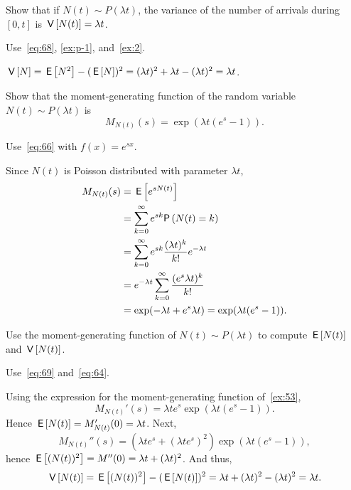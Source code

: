 \begin{extra}
  Show that if $N(t)\sim P(\lambda t)$, the variance of the number of arrivals during $[0,t]$ is $\,\mathsf{V}\left[N(t)\right] = \lambda t$.
\begin{hint} Use~\cref{eq:68}, \cref{ex:p-1},  and~\cref{ex:2}.
\end{hint}
\begin{solution} 
$\,\mathsf{V}\left[N\right] = \,\mathsf{E}\left[N^2\right] - (\,\mathsf{E}\left[N\right])^2 = (\lambda t)^2 + \lambda t - (\lambda t)^2 = \lambda t$.
\end{solution}
\end{extra}

\begin{extra} 
Show that the moment-generating function of the random variable~$N(t)\sim P(\lambda t)$ is
\begin{equation*}
M_{N(t)}(s) 
= \exp{(\lambda t(e^s-1))}.
\end{equation*}
\begin{hint}
Use~\cref{eq:66} with $f(x) = e^{sx}$. 
\end{hint}
\begin{solution}
Since $N(t)$ is Poisson distributed with parameter $\lambda t$, 
\begin{align*}
M_{N(t)}(s)
&= \E{e^{s N(t)}} \\
&= \sum_{k=0}^\infty e^{s k} \P{N(t)=k} \\
&= \sum_{k=0}^\infty e^{s k} \frac{(\lambda t)^k}{k!} e^{-\lambda t} \\
&= e^{-\lambda t} \sum_{k=0}^\infty \frac{(e^s \lambda t)^k}{k!} \\
&= \exp(-\lambda t + e^s \lambda t) =\exp(\lambda t(e^s - 1)).
\end{align*}
\end{solution}
\end{extra}


\begin{exercise} 
 Use the moment-generating function of $N(t)\sim P(\lambda t)$ to compute $\,\mathsf{E}\left[N(t)\right]$ and $\,\mathsf{V}\left[N(t)\right]$. 
\begin{hint}
Use~\cref{eq:69} and~\cref{eq:64}. 
\end{hint}
\begin{solution}
Using the expression for the moment-generating function of~\cref{ex:53},
 \begin{equation*}
 M_{N(t)}'(s) = \lambda t e^s \exp(\lambda t(e^s - 1)).
 \end{equation*}
Hence $\,\mathsf{E}\left[N(t)\right] = M_{N(t)}'(0) = \lambda t $. Next, 
 \begin{equation*}
 M_{N(t)}''(s) = (\lambda t e^s + (\lambda t e^s)^2) \exp(\lambda t(e^s - 1)),
 \end{equation*}
hence $\,\mathsf{E}\left[(N(t))^2\right] = M''(0) = \lambda t + (\lambda t)^2$. And thus, 
\begin{equation*}
\,\mathsf{V}\left[N(t)\right] =\,\mathsf{E}\left[(N(t))^2\right]-(\,\mathsf{E}\left[N(t)\right])^2 = \lambda t + (\lambda t)^2 - (\lambda t)^2 = \lambda t.
\end{equation*}
\end{solution}
\end{exercise}

